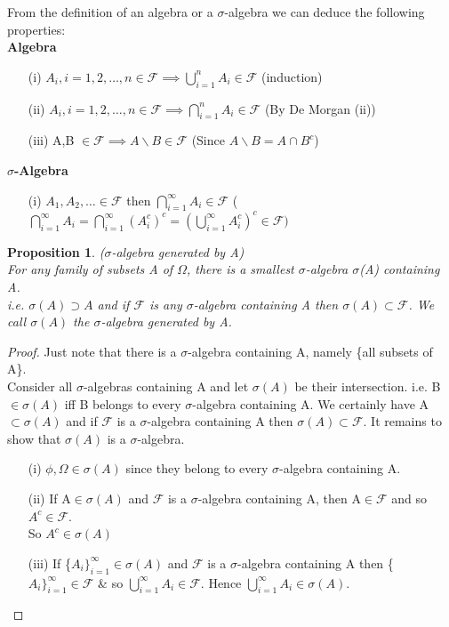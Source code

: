 \documentclass[12pt]{article}
\newtheorem{prop}{Proposition}
\begin{document}
From the definition of an algebra or a $\sigma$-algebra we can deduce the following properties:
\vspace{20pt}\\
{\bf Algebra}
\begin{itemize}
  \item[(i)] $A_{i}, i=1,2,\dots,n \in \mathcal{F} \implies \bigcup_{i=1}^{n} A_{i} \in \mathcal{F}$ (induction)
  \item[(ii)]  $A_{i}, i=1,2,\dots,n \in \mathcal{F} \implies \bigcap_{i=1}^{n} A_{i} \in \mathcal{F}$ (By De Morgan (ii))
  \item[(iii)] A,B $\in \mathcal{F} \implies A\backslash B\in \mathcal{F}$ (Since $A\backslash B=A\cap B^{c}$)
\end{itemize}

\vspace{12pt}
{\bf $\sigma$-Algebra}
\begin{itemize}
  \item[(i)]  $A_{1}, A_{2},\dots \in \mathcal{F}$ then $\bigcap_{i=1}^{\infty} A_{i} \in \mathcal{F}$  ($\bigcap_{i=1}^{\infty} A_{i} = \bigcap_{i=1}^{\infty}( A_{i}^{c})^{c}= (\bigcup_{i=1}^{\infty} A_{i}^{c})^{c}\in \mathcal{F})$
\end{itemize}
\vspace{12pt}
\begin{prop}($\sigma$-algebra generated by A)\\ For any family of subsets A of $\Omega$, there is a smallest $\sigma$-algebra $\sigma$(A) containing A.\\ i.e. $\sigma(A) \supset A$ and if $\mathcal{F}$ is any $\sigma$-algebra containing A then 
$\sigma(A)\subset\mathcal{F}$. We call $\sigma(A)$ the $\sigma$-algebra generated by A.
\end{prop}

\begin{proof}
Just note that there is a $\sigma$-algebra containing A, namely \{all subsets of A\}.\\ Consider all $\sigma$-algebras containing A and let $\sigma(A)$ be their intersection. i.e. B$\in\sigma(A)$ iff B belongs to every $\sigma$-algebra containing A. We certainly have A$\subset\sigma(A)$ and if $\mathcal{F}$ is a $\sigma$-algebra containing A then $\sigma(A)\subset\mathcal{F}$. It remains to show that $\sigma(A)$ is a $\sigma$-algebra.
\begin{itemize}
  \item[(i)] $\phi, \Omega \in \sigma(A)$ since they belong to every $\sigma$-algebra containing A.
  \item[(ii)]  If A$\in \sigma(A)$ and $\mathcal{F}$ is a $\sigma$-algebra containing A, then A$\in \mathcal{F}$ and so $A^{c}\in\mathcal{F}$.\\ So $A^{c}\in\sigma(A)$
  \item[(iii)] If \{$A_{i}\}_{i=1}^{\infty}\in\sigma(A)$ and $\mathcal{F}$ is a $\sigma$-algebra containing A then  \{$A_{i}\}_{i=1}^{\infty}\in\mathcal{F}$ \& so $\bigcup_{i=1}^{\infty} A_{i}\in\mathcal{F}$. Hence $\bigcup_{i=1}^{\infty} A_{i}\in\sigma(A)$.
\end{itemize}
\end{proof}
\end{document}
